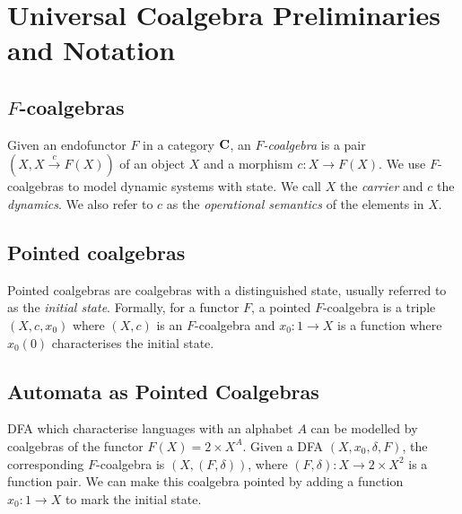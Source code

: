 \section{Universal Coalgebra Preliminaries and Notation}
\label{sec:Preliminaries:Coalgebras}
\subsection{\texorpdfstring{$F$-coalgebras}{F-coalgebras}}
Given an endofunctor $F$ in a category $\AsCategory{C}$, an \emph{$F$-coalgebra} is a pair $(X,X\xrightarrow{c}F(X))$ of an object $X$ and a morphism $c\colon X\rightarrow F(X)$. We use $F$-coalgebras to model dynamic systems with state. We call $X$ the \emph{carrier} and $c$ the \emph{dynamics}. We also refer to $c$ as the \emph{operational semantics} of the elements in $X$.


\subsection{Pointed coalgebras}
Pointed coalgebras are coalgebras with a distinguished state, usually referred to as the \emph{initial state}. Formally, for a functor $F$, a pointed $F$-coalgebra is a triple $(X,c, x_0)$ where $(X,c)$ is an $F$-coalgebra and %
$x_0\colon 1\rightarrow X$ is a function where $x_0(0)$ characterises the initial state. 

\subsection{Automata as Pointed Coalgebras}
DFA which characterise languages with an alphabet $A$ can be modelled by coalgebras of the functor $F(X)=2\times X^A$. Given a DFA $(X,x_0,\delta,F)$, the corresponding $F$-coalgebra is $(X,(F,\delta))$, where $(F,\delta)\colon X\rightarrow 2\times X^2$ is a function pair. We can make this coalgebra pointed by adding a function $x_0\colon 1\rightarrow X$ to mark the initial state.

